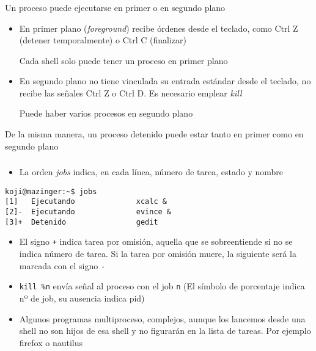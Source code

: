 \documentclass[ucs]{beamer}
\begin{document}
\begin{frame}[fragile]
\frametitle{}
Un proceso puede ejecutarse en primer o en segundo plano
\begin{itemize}
\item
En primer plano (\emph{foreground}) recibe
órdenes desde el teclado, como Ctrl Z  (detener
temporalmente) o Ctrl C (finalizar)

Cada shell solo puede tener un proceso en primer plano
\item
En segundo plano no tiene vinculada su entrada
estándar desde el teclado, no recibe las señales Ctrl Z o Ctrl D.
Es necesario emplear \emph{kill}

Puede haber varios procesos en segundo plano
\end{itemize}

De la misma manera, un proceso detenido puede estar tanto en primer
como en segundo plano
\end{frame}


\begin{frame}[fragile]
\frametitle{}
\begin{itemize}
\item
La orden \emph{jobs} indica, en cada línea, número de tarea, estado y nombre
\end{itemize}

  \begin{footnotesize}
  \begin{verbatim}
koji@mazinger:~$ jobs
[1]   Ejecutando              xcalc &
[2]-  Ejecutando              evince &
[3]+  Detenido                gedit
  \end{verbatim}
  \end{footnotesize}

\begin{itemize}
\item
El signo \verb|+| indica tarea por omisión, aquella que
se sobreentiende si no se indica número de tarea.
Si la tarea por omisión muere, la siguiente será la marcada
con el signo \verb|-|
\item

\verb|kill %n| envía señal al proceso con el job \verb|n|
(El símbolo de porcentaje indica nº de job, su ausencia indica pid)
\item
Algunos programas multiproceso, complejos, aunque los lancemos desde una shell no son
hijos de esa shell y no figurarán en la lista de tareas. Por ejemplo firefox o nautilus
\end{itemize}
\end{frame}
\end{document}
